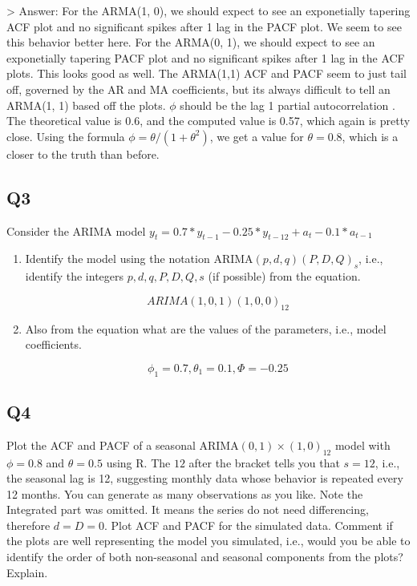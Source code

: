 \documentclass[
]{article}
\begin{document}
\begin{enumerate}[label=(\alph*)]
> Answer: For the ARMA(1, 0), we should expect to see an exponetially tapering 
ACF plot and no significant spikes after 1 lag in the PACF plot. We seem 
to see this behavior better here. For the ARMA(0, 1), we should expect to see an exponetially tapering  
PACF plot and no significant spikes after 1 lag in the ACF plots. This looks good 
as well. The ARMA(1,1) 
ACF and PACF seem to just tail off, governed by the AR and MA coefficients, but 
its always difficult to tell an ARMA(1, 1) based off the plots. $\phi$ should be the lag 1 partial autocorrelation . The theoretical value 
is 0.6, and the computed value is 0.57, which again is pretty close. Using 
the formula $\phi = \theta / (1 + \theta^2)$, we get a value for $\theta = 0.8$, 
which is a closer to the truth than before. 

\end{enumerate}

\hypertarget{q3}{%
\subsection{Q3}\label{q3}}

Consider the ARIMA model
\(y_t=0.7*y_{t-1}-0.25*y_{t-12}+a_t-0.1*a_{t-1}\)

\begin{enumerate}[label=(\alph*)]

\item Identify the model using the notation ARIMA$(p,d,q)(P,D,Q)_ s$, i.e., identify the integers $p,d,q,P,D,Q,s$ (if possible) from the equation.

$$ARIMA(1, 0, 1)(1, 0, 0)_{12}$$

\item Also from the equation what are the values of the parameters, i.e., model coefficients. 

$$\phi_1 = 0.7, \theta_1 = 0.1, \Phi = -0.25$$

\end{enumerate}

\hypertarget{q4}{%
\subsection{Q4}\label{q4}}

Plot the ACF and PACF of a seasonal ARIMA\((0, 1)\times(1, 0)_{12}\)
model with \(\phi =0 .8\) and \(\theta = 0.5\) using R. The \(12\) after
the bracket tells you that \(s=12\), i.e., the seasonal lag is 12,
suggesting monthly data whose behavior is repeated every 12 months. You
can generate as many observations as you like. Note the Integrated part
was omitted. It means the series do not need differencing, therefore
\(d=D=0\). Plot ACF and PACF for the simulated data. Comment if the
plots are well representing the model you simulated, i.e., would you be
able to identify the order of both non-seasonal and seasonal components
from the plots? Explain.
\end{document}

